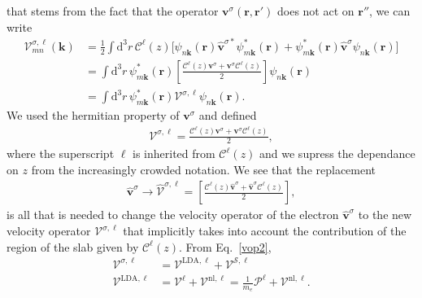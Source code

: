 that stems from the fact that the operator $\mathbf{v}^\sigma(\mathbf{r},\mathbf{r}')$ does not act on
$\mathbf{r}''$, we can write
\begin{align}\label{nl.3}
\boldsymbol{\mathcal{V}}^{\sigma,\ell}_{mn}({\mathbf k})
&=
\frac{1}{2}
\int \mathrm{d}^3 r\,
 \mathcal{C}^{\ell}(z)
 \bigg[
\psi_{n\mathbf{k}}(\mathbf{r})
\hat{\mathbf{v}}^{\sigma *}\psi^{*}_{m\mathbf{k}}(\mathbf{r})
+ 
\psi^*_{m\mathbf{k}}(\mathbf{r})\hat{\mathbf{v}}^{\sigma}
\psi_{n\mathbf{k}}(\mathbf{r})
\bigg]
\nonumber\\
&=
\int \mathrm{d}^3 r\,
\psi^*_{m\mathbf{k}}(\mathbf{r})
\left[\frac{\mathcal{C}^{\ell}(z) \mathbf{v}^\sigma +
\mathbf{v}^\sigma \mathcal{C}^{\ell}(z)}{2}\right]
\psi_{n\mathbf{k}}(\mathbf{r})
\nonumber\\
&=
\int \mathrm{d}^3 r\,
\psi^*_{m\mathbf{k}}(\mathbf{r})
\boldsymbol{\mathcal{V}}^{\sigma,\ell}
\psi_{n\mathbf{k}}(\mathbf{r})
.
\end{align}
We used the hermitian property of $\mathbf{v}^\sigma$ and defined
\begin{align}\label{nl.4}
\boldsymbol{\mathcal{V}}^{\sigma,\ell}
=
\frac{\mathcal{C}^{\ell}(z) \mathbf{v}^\sigma +
\mathbf{v}^\sigma \mathcal{C}^{\ell}(z)}{2}
,
\end{align} 
where the superscript $\ell$ is inherited from $\mathcal{C}^{\ell}(z)$ and we
supress the dependance on $z$ from the increasingly crowded notation.  
We see that the replacement
\begin{align}\label{vcali}
\hat{\mathbf{v}}^{\sigma} \to \hat{\boldsymbol{\mathcal{V}}}^{\sigma,\ell}=\left[\frac{\mathcal{C}^{\ell}(z) \hat{\mathbf{v}}^{\sigma} +
\hat{\mathbf{v}}^{\sigma}\mathcal{C}^{\ell}(z)}{2}\right]
,
\end{align} 
is all that is needed to change the
velocity operator of the electron $\hat{\mathbf{v}}^{\sigma}$ to the new velocity
operator $\boldsymbol{\mathcal{V}}^{\sigma,\ell}$ that implicitly takes into account the
contribution of the region of the slab given by $\mathcal{C}^{\ell}(z)$.
From Eq.~\eqref{vop2},
\begin{align}\label{vopii}
\boldsymbol{\mathcal{V}}^{\sigma,\ell}
&=
\boldsymbol{\mathcal{V}}^{\mathrm{LDA},\ell}
+
\boldsymbol{\mathcal{V}}^{\mathcal{S},\ell}
\nonumber\\
\boldsymbol{\mathcal{V}}^{\mathrm{LDA},\ell}
&=
\boldsymbol{\mathcal{V}}^{\ell}
+
\boldsymbol{\mathcal{V}}^{\mathrm{nl},\ell}
=
\frac{1}{m_{e}}
\boldsymbol{\mathcal{P}}^{\ell}
+
\boldsymbol{\mathcal{V}}^{\mathrm{nl},\ell}
.
\end{align}
